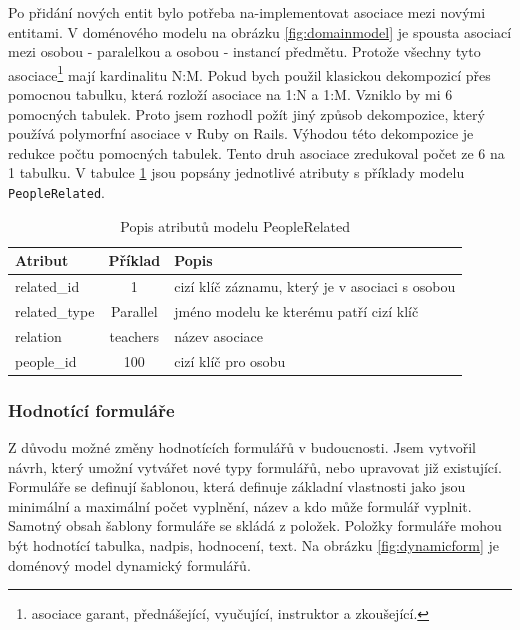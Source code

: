 Po přidání nových entit bylo potřeba na-implementovat asociace mezi novými entitami. V doménového modelu na obrázku \ref{fig:domainmodel} je spousta asociací mezi osobou - paralelkou a osobou - instancí předmětu. Protože všechny tyto asociace\footnote{asociace garant, přednášející, vyučující, instruktor a zkoušející.} mají kardinalitu N:M. Pokud bych použil klasickou dekompozicí přes pomocnou tabulku, která rozloží asociace na 1:N a 1:M. Vzniklo by mi 6 pomocných tabulek. Proto jsem rozhodl požít jiný způsob dekompozice, který používá polymorfní asociace \cite{guide_pa} v Ruby on Rails. Výhodou této  dekompozice je redukce počtu pomocných tabulek. Tento druh asociace zredukoval počet ze 6 na 1 tabulku. V tabulce \ref{tab:people_related} jsou popsány jednotlivé atributy s příklady modelu \verb|PeopleRelated|.

\begin{table}[h]
\begin{center}
\begin{tabular}{|l|c|l|}

\hline
\textbf{Atribut} & \textbf{Příklad} & \textbf{Popis} \\ \hline
related\_id & 1 & cizí klíč záznamu, který je v asociaci s osobou \\\hline
related\_type & Parallel & jméno modelu ke kterému patří cizí klíč \\ \hline
relation & teachers & název asociace \\\hline
people\_id & 100 & cizí klíč pro osobu  \\\hline

\end{tabular}
\caption{Popis atributů modelu PeopleRelated}
\label{tab:people_related}
\end{center}
\end{table}


\subsubsection{Hodnotící formuláře}
Z důvodu možné změny hodnotících formulářů v budoucnosti. Jsem vytvořil návrh, který umožní vytvářet nové typy formulářů, nebo upravovat již existující. Formuláře se definují šablonou, která definuje základní vlastnosti jako jsou minimální a maximální počet vyplnění, název a kdo může formulář vyplnit. Samotný obsah šablony formuláře se skládá z položek. Položky formuláře mohou být hodnotící tabulka, nadpis, hodnocení, text. Na obrázku \ref{fig:dynamicform} je doménový model dynamický formulářů.

